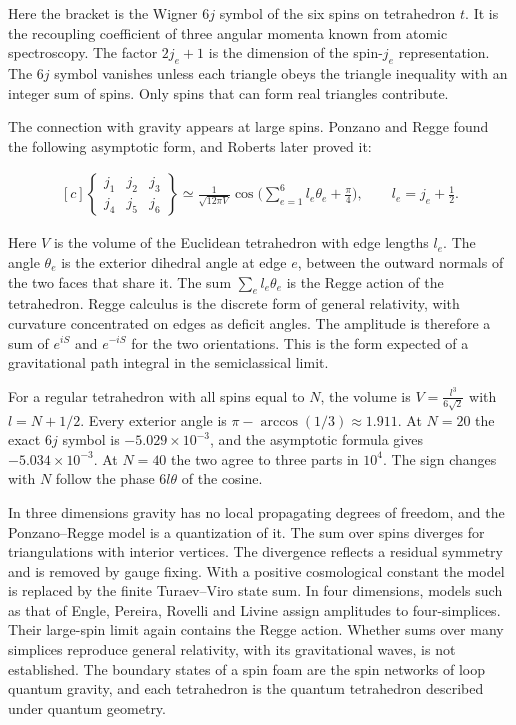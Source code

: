 \documentclass[11pt,oneside]{book}
\newenvironment{centeredalign}{\[\begin{gathered}[c]}{\end{gathered}\]}
\begin{document}
Here the bracket is the Wigner \(6j\) symbol of the six spins on tetrahedron \(t\). It is the recoupling coefficient of three angular momenta known from atomic spectroscopy. The factor \(2j_e+1\) is the dimension of the spin-\(j_e\) representation. The \(6j\) symbol vanishes unless each triangle obeys the triangle inequality with an integer sum of spins. Only spins that can form real triangles contribute.

The connection with gravity appears at large spins. Ponzano and Regge found the following asymptotic form, and Roberts later proved it:

\begin{centeredalign}
\begin{Bmatrix}j_1&j_2&j_3\\ j_4&j_5&j_6\end{Bmatrix}\simeq
\frac{1}{\sqrt{12\pi V}}\cos\Big(\sum_{e=1}^6 l_e\theta_e+\frac\pi4\Big),\qquad l_e=j_e+\tfrac12.
\end{centeredalign}

Here \(V\) is the volume of the Euclidean tetrahedron with edge lengths \(l_e\). The angle \(\theta_e\) is the exterior dihedral angle at edge \(e\), between the outward normals of the two faces that share it. The sum \(\sum_el_e\theta_e\) is the Regge action of the tetrahedron. Regge calculus is the discrete form of general relativity, with curvature concentrated on edges as deficit angles. The amplitude is therefore a sum of \(e^{iS}\) and \(e^{-iS}\) for the two orientations. This is the form expected of a gravitational path integral in the semiclassical limit.

For a regular tetrahedron with all spins equal to \(N\), the volume is \(V=\frac{l^3}{6\sqrt2}\) with \(l=N+1/2\). Every exterior angle is \(\pi-\arccos(1/3)\approx1.911\). At \(N=20\) the exact \(6j\) symbol is \(-5.029\times10^{-3}\), and the asymptotic formula gives \(-5.034\times10^{-3}\). At \(N=40\) the two agree to three parts in \(10^4\). The sign changes with \(N\) follow the phase \(6l\theta\) of the cosine.

In three dimensions gravity has no local propagating degrees of freedom, and the Ponzano--Regge model is a quantization of it. The sum over spins diverges for triangulations with interior vertices. The divergence reflects a residual symmetry and is removed by gauge fixing. With a positive cosmological constant the model is replaced by the finite Turaev--Viro state sum. In four dimensions, models such as that of Engle, Pereira, Rovelli and Livine assign amplitudes to four-simplices. Their large-spin limit again contains the Regge action. Whether sums over many simplices reproduce general relativity, with its gravitational waves, is not established. The boundary states of a spin foam are the spin networks of loop quantum gravity, and each tetrahedron is the quantum tetrahedron described under quantum geometry.
\end{document}
